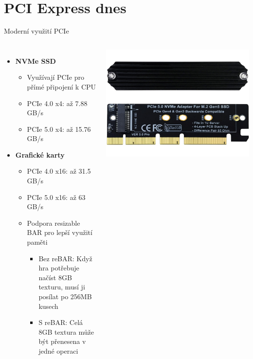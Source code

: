 \documentclass[aspectratio=43]{beamer}
\begin{document}
\section{PCI Express dnes}
\begin{frame}{Moderní využití PCIe}
    \begin{columns}
        \begin{itemize}
            \item \textbf{NVMe SSD}
                \begin{itemize}
                    \item Využívají PCIe pro přímé připojení k CPU
                    \item PCIe 4.0 x4: až 7.88 GB/s
                    \item PCIe 5.0 x4: až 15.76 GB/s
                \end{itemize}
            \item \textbf{Grafické karty}
                \begin{itemize}
                    \item PCIe 4.0 x16: až 31.5 GB/s
                    \item PCIe 5.0 x16: až 63 GB/s
                    \item Podpora resizable BAR pro lepší využití paměti
                    \begin{itemize}
                        \item Bez reBAR: Když hra potřebuje načíst 8GB texturu, musí ji posílat po 256MB kusech
                        \item S reBAR: Celá 8GB textura může být přenesena v jedné operaci
                    \end{itemize}
                \end{itemize}
        \end{itemize}
        \begin{center}
            \includegraphics[width=1\linewidth]{extrahovane_obrazky/nvme.jpeg}
        \end{center}
    \end{columns}
\end{frame}
\end{document}
